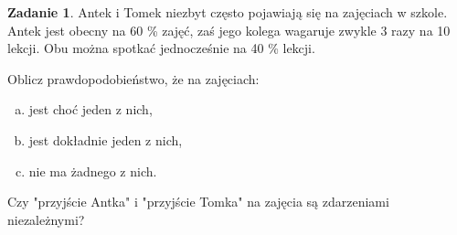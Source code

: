 \documentclass[11pt]{article}
\theoremstyle{definition}
\newtheorem{zadanie}{Zadanie}
\numberwithin{zadanie}{section}
\begin{document}
\begin{zadanie}
    Antek i Tomek niezbyt często pojawiają się na zajęciach w szkole. Antek jest obecny na 60 \% zajęć, zaś jego kolega wagaruje zwykle 3 razy na 10 lekcji. Obu można spotkać jednocześnie na 40 \% lekcji.

    Oblicz prawdopodobieństwo, że na zajęciach:

    \begin{enumerate}[a)]
        \item jest choć jeden z nich,
        \item jest dokładnie jeden z nich,
        \item nie ma żadnego z nich.
    \end{enumerate}
    Czy "przyjście Antka" i "przyjście Tomka" na zajęcia są zdarzeniami niezależnymi?
\end{zadanie}
\end{document}

